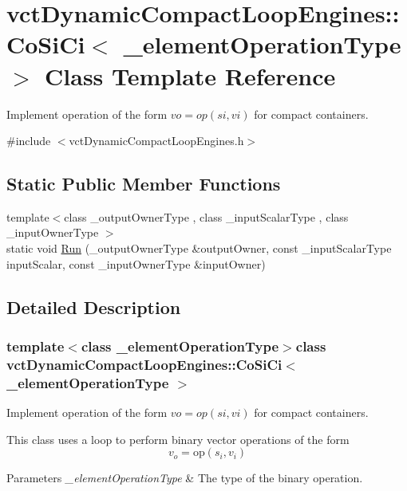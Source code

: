 \hypertarget{classvct_dynamic_compact_loop_engines_1_1_co_si_ci}{}\section{vct\+Dynamic\+Compact\+Loop\+Engines\+:\+:Co\+Si\+Ci$<$ \+\_\+element\+Operation\+Type $>$ Class Template Reference}
\label{classvct_dynamic_compact_loop_engines_1_1_co_si_ci}


Implement operation of the form $vo = op(si, vi)$ for compact containers.  




{\ttfamily \#include $<$vct\+Dynamic\+Compact\+Loop\+Engines.\+h$>$}

\subsection*{Static Public Member Functions}
\begin{DoxyCompactItemize}
\item 
{\footnotesize template$<$class \+\_\+output\+Owner\+Type , class \+\_\+input\+Scalar\+Type , class \+\_\+input\+Owner\+Type $>$ }\\static void \hyperlink{classvct_dynamic_compact_loop_engines_1_1_co_si_ci_a37cb9bf2d0b699b35d29373750e20a44}{Run} (\+\_\+output\+Owner\+Type \&output\+Owner, const \+\_\+input\+Scalar\+Type input\+Scalar, const \+\_\+input\+Owner\+Type \&input\+Owner)
\end{DoxyCompactItemize}


\subsection{Detailed Description}
\subsubsection*{template$<$class \+\_\+element\+Operation\+Type$>$class vct\+Dynamic\+Compact\+Loop\+Engines\+::\+Co\+Si\+Ci$<$ \+\_\+element\+Operation\+Type $>$}

Implement operation of the form $vo = op(si, vi)$ for compact containers. 

This class uses a loop to perform binary vector operations of the form \[ v_o = \mathrm{op}(s_i, v_i) \]


\begin{DoxyParams}{Parameters}
{\em \+\_\+element\+Operation\+Type} & The type of the binary operation. \\
\hline
\end{DoxyParams}



